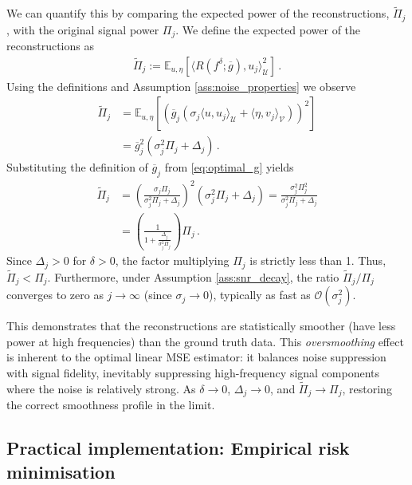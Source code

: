 We can quantify this by comparing the expected power of the reconstructions, $\tilde{\Pi}_j$, with the original signal power $\Pi_j$. We define the expected power of the reconstructions as
\begin{align*}
\tilde{\Pi}_j := \mathbb{E}_{u,\eta}\left[ \langle R(f^\delta; \overline{g}), u_j \rangle_{\mathcal{U}}^2 \right] \, .
\end{align*}
Using the definitions and Assumption \ref{ass:noise_properties} we observe
\begin{align*}
\tilde{\Pi}_j &= \mathbb{E}_{u,\eta}\left[ \left( \overline{g}_j (\sigma_j \langle u, u_j \rangle_{\mathcal{U}} + \langle \eta, v_j \rangle_{\mathcal{V}}) \right)^2 \right] \\
&= \overline{g}_j^2 (\sigma_j^2 \Pi_j + \Delta_j) \, .
\end{align*}
Substituting the definition of $\overline{g}_j$ from \eqref{eq:optimal_g} yields
\begin{align*}
\tilde{\Pi}_j &= \left( \frac{\sigma_j \Pi_j}{\sigma_j^2 \Pi_j + \Delta_j} \right)^2 (\sigma_j^2 \Pi_j + \Delta_j) = \frac{\sigma_j^2 \Pi_j^2}{\sigma_j^2 \Pi_j + \Delta_j} \\
&= \left( \frac{1}{1 + \frac{\Delta_j}{\sigma_j^2 \Pi_j}} \right) \Pi_j \, .
\end{align*}
Since $\Delta_j > 0$ for $\delta > 0$, the factor multiplying $\Pi_j$ is strictly less than 1. Thus, $\tilde{\Pi}_j < \Pi_j$. Furthermore, under Assumption \ref{ass:snr_decay}, the ratio $\tilde{\Pi}_j/\Pi_j$ converges to zero as $j \to \infty$ (since $\sigma_j \to 0$), typically as fast as $\mathcal{O}(\sigma_j^2)$.

This demonstrates that the reconstructions are statistically smoother (have less power at high frequencies) than the ground truth data. This \emph{oversmoothing} effect is inherent to the optimal linear MSE estimator: it balances noise suppression with signal fidelity, inevitably suppressing high-frequency signal components where the noise is relatively strong. As $\delta \to 0$, $\Delta_j \to 0$, and $\tilde{\Pi}_j \to \Pi_j$, restoring the correct smoothness profile in the limit.

\subsection{Practical implementation: Empirical risk minimisation}

